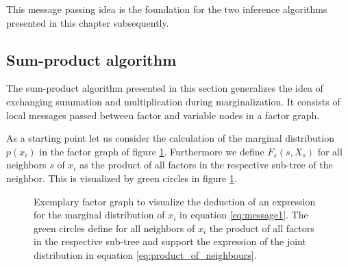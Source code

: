 \documentclass{sigkdd}
\begin{document}
This message passing idea is the foundation for the two inference algorithms presented in this chapter subsequently.


\subsection{Sum-product algorithm}
The sum-product algorithm presented in this section generalizes the idea of exchanging summation and multiplication during marginalization. It consists of local messages passed between factor and variable nodes in a factor graph.

As a starting point let us consider the calculation of the marginal distribution $p(x_i)$ in the factor graph of figure \ref{fig:message1}. Furthermore we define $F_s(s, X_s)$ for all neighbors $s$ of $x_i$ as the product of all factors in the respective sub-tree of the neighbor. This is visualized by green circles in figure \ref{fig:message1}.
\begin{figure}[h]
	\centering
	\caption{Exemplary factor graph to visualize the deduction of an expression for the marginal distribution of $x_i$ in equation \ref{eq:message1}. The green circles define for all neighbors of $x_i$ the product of all factors in the respective sub-tree and support the expression of the joint distribution in equation \ref{eq:product_of_neighbours}.}\label{fig:message1}
\end{figure}
\end{document}
